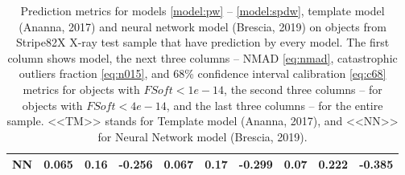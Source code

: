 \documentclass[fleqn,usenatbib]{mnras}
\begin{document}
\begin{table}
\begin{tabular}{llllllllll}
            NN             &                             0.065 &            0.16 &           -0.256 &                             0.067 &            0.17 &           -0.299 &                             0.07 &           0.222 &          -0.385 \\
            \hline
            \end{tabular}
            \caption{Prediction metrics for models \ref{model:pw} -- \ref{model:spdw}, template model (Ananna, 2017) and neural network model (Brescia, 2019) on objects from Stripe82X X-ray test sample that have prediction by every model. The first column shows model, the next three columns -- NMAD \eqref{eq:nmad}, catastrophic outliers fraction \eqref{eq:n015}, and 68\% confidence interval calibration \eqref{eq:c68} metrics for objects with $FSoft < 1e-14$, the second three columns -- for objects with $FSoft < 4e-14$, and the last three columns -- for the entire sample. <<TM>> stands for Template model (Ananna, 2017), and <<NN>> for Neural Network model (Brescia, 2019).}
\end{table}
\end{document}
